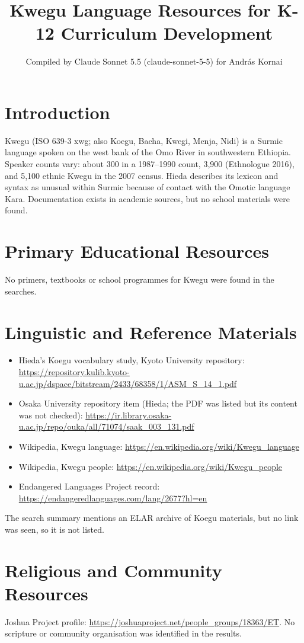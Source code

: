 \documentclass[12pt]{article}
\title{Kwegu Language Resources for K-12 Curriculum Development}
\author{Compiled by Claude Sonnet 5.5 (claude-sonnet-5-5) for Andr\'as Kornai}
\date{}
\begin{document}
\maketitle

\section{Introduction}
Kwegu (ISO 639-3 xwg; also Koegu, Bacha, Kwegi, Menja, Nidi) is a Surmic language spoken on the west bank of the Omo River in southwestern Ethiopia. Speaker counts vary: about 300 in a 1987--1990 count, 3,900 (Ethnologue 2016), and 5,100 ethnic Kwegu in the 2007 census. Hieda describes its lexicon and syntax as unusual within Surmic because of contact with the Omotic language Kara. Documentation exists in academic sources, but no school materials were found.

\section{Primary Educational Resources}
No primers, textbooks or school programmes for Kwegu were found in the searches.

\section{Linguistic and Reference Materials}
\begin{itemize}
\item Hieda's Koegu vocabulary study, Kyoto University repository: \url{https://repository.kulib.kyoto-u.ac.jp/dspace/bitstream/2433/68358/1/ASM_S_14_1.pdf}
\item Osaka University repository item (Hieda; the PDF was listed but its content was not checked): \url{https://ir.library.osaka-u.ac.jp/repo/ouka/all/71074/saak_003_131.pdf}
\item Wikipedia, Kwegu language: \url{https://en.wikipedia.org/wiki/Kwegu_language}
\item Wikipedia, Kwegu people: \url{https://en.wikipedia.org/wiki/Kwegu_people}
\item Endangered Languages Project record: \url{https://endangeredlanguages.com/lang/2677?hl=en}
\end{itemize}
The search summary mentions an ELAR archive of Koegu materials, but no link was seen, so it is not listed.

\section{Religious and Community Resources}
Joshua Project profile: \url{https://joshuaproject.net/people_groups/18363/ET}. No scripture or community organisation was identified in the results.
\end{document}
